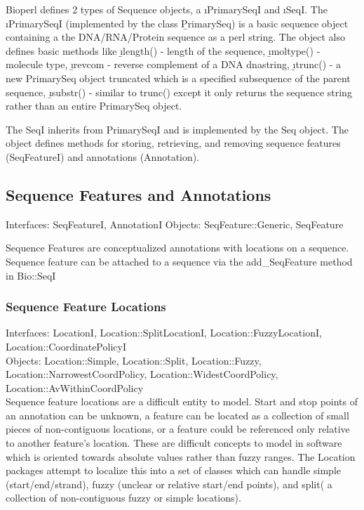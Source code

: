 \documentclass{article}
\begin{document}
\begin{twocolumn}
Bioperl defines 2 types of Sequence objects, a \i{PrimarySeqI} and \i{SeqI}.
The \i{PrimarySeqI} (implemented by the class \b{PrimarySeq}) is a basic
sequence object containing a the DNA/RNA/Protein sequence as a perl
string.  The object also defines basic methods like 
\b{\i{length()}} - length of the sequence, 
\b{\i{moltype()}} - molecule type, 
\b{\i{revcom}} - reverse complement of a DNA dnastring, 
\b{\i{trunc()}} - a new PrimarySeq object truncated which is 
a specified subsequence of the parent sequence, 
\b{\i{substr()}} - similar to trunc() except it only returns the sequence string rather than an
entire PrimarySeq object.  
\par 
The SeqI inherits from PrimarySeqI and is implemented by the Seq
object.  The object defines methods for storing, retrieving, and
removing sequence features (SeqFeatureI) and annotations (Annotation).

\subsection{Sequence Features and Annotations}

Interfaces: SeqFeatureI, AnnotationI
Objects: SeqFeature::Generic, SeqFeature

Sequence Features are conceptualized annotations with locations on a
sequence.  Sequence feature can be attached to a sequence via the
add_SeqFeature method in Bio::SeqI 

\subsubsection{Sequence Feature Locations}
Interfaces: LocationI, Location::SplitLocationI,
Location::FuzzyLocationI, Location::CoordinatePolicyI
\\
Objects: Location::Simple, Location::Split, Location::Fuzzy,
Location::NarrowestCoordPolicy, Location::WidestCoordPolicy,
Location::AvWithinCoordPolicy
\\
Sequence feature locations are a difficult entity to model.  Start and
stop points of an annotation can be unknown, a feature can be located
as a collection of small pieces of non-contiguous locations, or a
feature could be referenced only relative to another feature's
location.  These are difficult concepts to model in software which is
oriented towards absolute values rather than fuzzy ranges.   The
Location packages attempt to localize this into a set of classes which
can handle simple (start/end/strand), fuzzy (unclear or relative
start/end points), and split( a collection of non-contiguous fuzzy or simple
locations).
  


\end{twocolumn}
\end{document}
